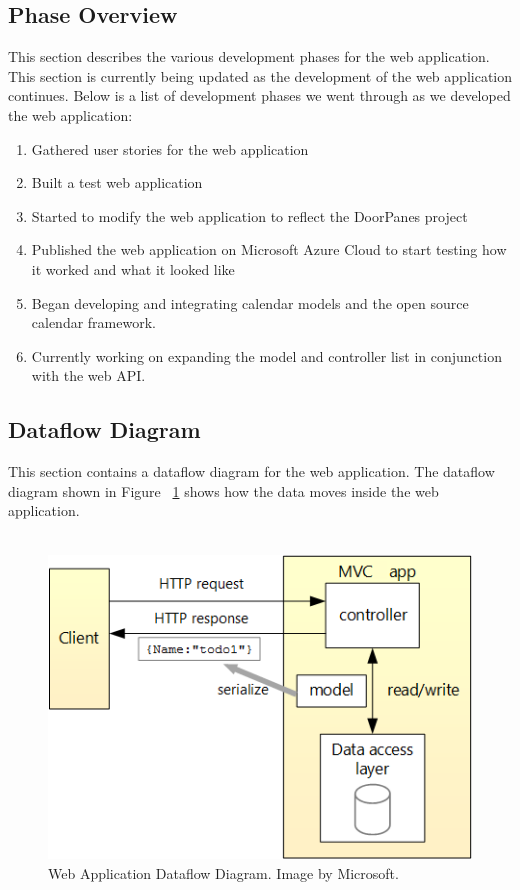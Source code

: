 \subsection{Phase Overview}
This section describes the various development phases for the web application. This section is currently being updated as the development of the web application continues. Below is a list of development phases we went through as we developed the web application:

\begin{enumerate}
\item Gathered user stories for the web application
\item Built a test web application
\item Started to modify the web application to reflect the DoorPanes project
\item Published the web application on Microsoft Azure Cloud to start testing how it worked and what it looked like
\item Began developing and integrating calendar models and the open source calendar framework.
\item Currently working on expanding the model and controller list in conjunction with the web API.
\end{enumerate}


\subsection{Dataflow Diagram}
This section contains a dataflow diagram for the web application. The dataflow diagram shown in Figure ~\ref{webAppDataflow} shows how the data moves inside the web application.\\\\

\begin{figure}[h!]
\centering
\includegraphics[scale=1.0]{DesignImages/webAppDataflow.png}
\caption{Web Application Dataflow Diagram. Image by Microsoft.}
\label{webAppDataflow}
\end{figure}

